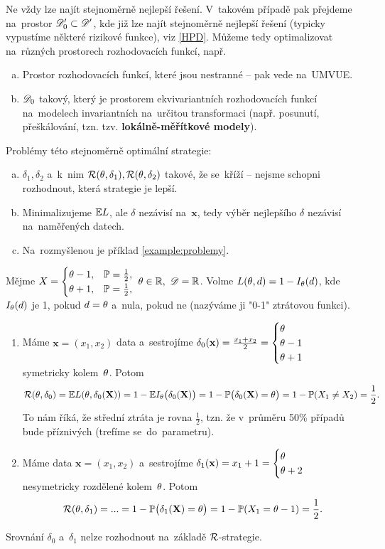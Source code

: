Ne vždy lze najít stejnoměrně nejlepší řešení. V~takovém případě pak přejdeme na~prostor $\mathscr{D}'_0\subset\mathscr{D}' $, kde již lze najít stejnoměrně nejlepší řešení (typicky vypustíme některé rizikové funkce), viz \ref{HPD}. Můžeme tedy optimalizovat na~různých prostorech rozhodovacích funkcí, např.
\begin{enumerate}[a)]
	\item  Prostor rozhodovacích funkcí, které jsou nestranné -- pak vede na~UMVUE.
	\item $\mathscr{D} _0$ takový, který je prostorem ekvivariantních rozhodovacích funkcí na~modelech invariantních na~určitou transformaci (např. posunutí, přeškálování, tzn. tzv. \textbf{lokálně-měřítkové modely}).
\end{enumerate}

Problémy této stejnoměrně optimální strategie: \begin{enumerate}[a)]
	\item $\delta_1,\delta_2$ a~k~nim $\mathcal{R}(\theta,\delta_1),\mathcal{R}(\theta,\delta_2)$ takové, že se~kříží -- nejsme schopni rozhodnout, která strategie je lepší.
	\item Minimalizujeme $\mathbb{E} L$, ale $\delta$ nezávisí na~$\textbf{x}$, tedy výběr nejlepšího $\delta$ nezávisí na~naměřených datech.
	\item Na~rozmyšlenou je příklad \ref{example:problemy}.
\end{enumerate}

\begin{example} \label{example:problemy}
	Mějme $X=\begin{cases}
	\theta-1, & \mathbb{P}= \frac{1}{2}, \\ \theta+1, & \mathbb{P}=\frac{1}{2},
	\end{cases}~\theta\in\mathbb{R},~\mathscr{D} =\mathbb{R}$. Volme
	$ L(\theta,d)=1-I_\theta(d)$, kde $I_\theta(d)$ je 1, pokud $d=\theta$ a~nula, pokud ne (nazýváme ji "0-1" ztrátovou funkci).
	
	\begin{enumerate}[1)]
		\item Máme $\textbf{x}=(x_1,x_2)$ data a~sestrojíme $\delta_0(\textbf{x})=\frac{x_1+x_2}{2}=\begin{cases}
		\theta\\\theta-1\\\theta+1
		\end{cases}$ symetricky kolem~$\theta$. Potom
		$$ \mathcal{R}(\theta,\delta_0)=\mathbb{E} L(\theta,\delta_0(\textbf{X}))=1-\mathbb{E} I_\theta\big(\delta_0(\textbf{X})\big)=1-\mathbb{P}\big(\delta_0(\textbf{X})=\theta\big)=1-\mathbb{P}(X_1\neq X_2)=\frac{1}{2}.$$ To nám říká, že střední ztráta je rovna $\frac{1}{2}$, tzn. že v~průměru 50\% případů bude příznivých (trefíme se~do~parametru).
		\item Máme data $\textbf{x}=(x_1,x_2)$ a~sestrojíme $\delta_1(\textbf{x})=x_1+1=\begin{cases}
		\theta\\\theta+2
		\end{cases}$ nesymetricky rozdělené kolem~$\theta$. Potom
		$$\mathcal{R}(\theta,\delta_1)=...=1-\mathbb{P}\big(\delta_1(\textbf{X})=\theta\big)=1-\mathbb{P}(X_1=\theta-1)=\frac{1}{2}.$$
	\end{enumerate}
	Srovnání $\delta_0$ a~$\delta_1$ nelze rozhodnout na~základě $\mathcal{R}$-strategie. 
\end{example}
